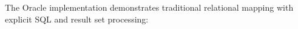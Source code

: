 \documentclass[12pt,a4paper]{article}
\begin{document}
The Oracle implementation demonstrates traditional relational mapping with explicit SQL and result set processing:
\begin{comment}
\begin{lstlisting}[language=Java, caption=Oracle JDBC Implementation]
public class StudentDAO {
    public List<Student> getAllStudents() throws SQLException {
        List<Student> students = new ArrayList<>();
        String sql = "SELECT student_id, name, email, phone, registration_date FROM Students ORDER BY name";
        
        try (Connection conn = connectionManager.getConnection();
             PreparedStatement stmt = conn.prepareStatement(sql);
             ResultSet rs = stmt.executeQuery()) {
            
            while (rs.next()) {
                Student student = new Student();
                student.setStudentId(rs.getInt("student_id"));
                student.setName(rs.getString("name"));
                student.setEmail(rs.getString("email"));
                student.setPhone(rs.getString("phone"));
                
                Date regDate = rs.getDate("registration_date");
                if (regDate != null) {
                    student.setRegistrationDate(regDate.toLocalDate());
                }
                students.add(student);
            }
        }
        return students;
    }
    
    public void addStudent(Student student) throws SQLException {
        String sql = "INSERT INTO Students (student_id, name, email, phone, address, registration_date) VALUES (?, ?, ?, ?, ?, ?)";
        try (Connection conn = connectionManager.getConnection();
             PreparedStatement stmt = conn.prepareStatement(sql)) {
            stmt.setInt(1, student.getStudentId());
            stmt.setString(2, student.getName());
            stmt.setString(3, student.getEmail());
            stmt.setString(4, student.getPhone());
            stmt.setString(5, student.getAddress());
            stmt.setDate(6, Date.valueOf(student.getRegistrationDate()));
            stmt.executeUpdate();
        }
    }
}
\end{lstlisting}
\end{comment}
\end{document}
